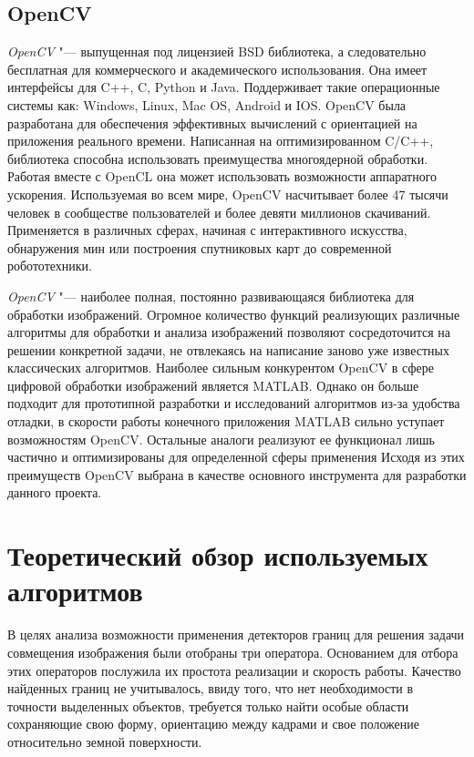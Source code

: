 \subsection{OpenCV}
\label{sub:env_description:opencv}
\textit{OpenCV} "--- выпущенная под лицензией BSD библиотека, а следовательно бесплатная для коммерческого и академического использования. Она имеет интерфейсы для C++, C, Python и Java. Поддерживает такие операционные системы как: Windows, Linux, Mac OS, Android и IOS. OpenCV была разработана для обеспечения эффективных вычислений с ориентацией на приложения реального времени. Написанная на оптимизированном C/C++, библиотека способна использовать преимущества многоядерной обработки. Работая вместе с OpenCL она может использовать возможности аппаратного ускорения. Используемая во всем мире, OpenCV насчитывает более 47 тысячи человек в сообществе пользователей и более девяти миллионов скачиваний. Применяется в различных сферах, начиная с интерактивного искусства, обнаружения мин или построения спутниковых карт до современной робототехники. \cite{opencv_offical}

\textit{OpenCV} "--- наиболее полная, постоянно развивающаяся библиотека для обработки изображений. Огромное количество функций реализующих различные алгоритмы для обработки и анализа изображений позволяют сосредоточится на решении конкретной задачи, не отвлекаясь на написание заново уже известных классических алгоритмов. Наиболее сильным конкурентом OpenCV в сфере цифровой обработки изображений является MATLAB. Однако он больше подходит для прототипной разработки и исследований алгоритмов из-за удобства отладки, в скорости работы конечного приложения MATLAB сильно уступает возможностям OpenCV. Остальные аналоги реализуют ее функционал лишь частично и оптимизированы для определенной сферы применения Исходя из этих преимуществ OpenCV выбрана в качестве основного инструмента для разработки данного проекта. 

\section{Теоретический обзор используемых алгоритмов}
\label{sec:realization}
В целях анализа возможности применения детекторов границ для решения задачи совмещения изображения были отобраны три оператора. Основанием для отбора этих операторов послужила их простота реализации и скорость работы. Качество найденных границ не учитывалось, ввиду того, что нет необходимости в точности выделенных объектов, требуется только найти особые области сохраняющие свою форму, ориентацию между кадрами и свое положение относительно земной поверхности.

